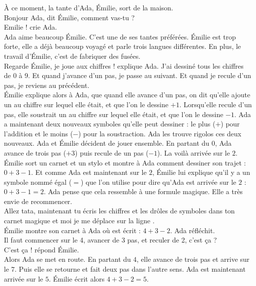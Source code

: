 À ce moment, la tante d'Ada, Émilie, sort de la maison. \\
\guillemotleft Bonjour Ada, dit Émilie, comment vas-tu ?\\
\mdash Emilie !  crie Ada. \guillemotright \\
Ada aime beaucoup Émilie. C’est une de ses tantes préférées. Émilie est trop forte, elle a déjà beaucoup voyagé et parle trois langues différentes. En plus, le travail d’Émilie, c’est de fabriquer des fusées.\\
\guillemotleft Regarde Émilie, je joue aux chiffres ! explique Ada. J’ai dessiné tous les chiffres de 0 à 9. Et quand j’avance d’un pas, je passe au suivant. Et quand je recule d’un pas, je reviens au précédent. \guillemotright \\
Émilie explique alors à Ada, que quand elle avance d’un pas, on dit qu’elle ajoute un au chiffre sur lequel elle était, et que l’on le dessine $+1$. Lorsqu’elle recule d’un pas, elle soustrait un au chiffre sur lequel elle était, et que l’on le dessine $-1$. Ada a maintenant deux nouveaux symboles qu’elle peut dessiner : le plus ($+$) pour l’addition et le moins ($-$) pour la soustraction. Ada les trouve rigolos ces deux nouveaux. 
Ada et Émilie décident de jouer ensemble. En partant du $0$, Ada avance de trois pas ($+3$) puis recule de un pas ($-1$). La voilà arrivée sur le $2$. Émilie sort un carnet et un stylo et montre à Ada comment dessiner son trajet : $0 + 3 - 1 $. Et comme Ada est maintenant sur le $2$, Émilie lui explique qu’il y a un symbole nommé égal ($=$) que l’on utilise pour dire qu’Ada est arrivée sur le $2$ : $0 + 3 - 1 = 2$. Ada pense que cela ressemble à une formule magique. Elle a très envie de recommencer. \\
\guillemotleft Allez tata, maintenant tu écris les chiffres et les drôles de symboles dans ton carnet magique et moi je me déplace sur la ligne \guillemotright. \\
Émilie montre son carnet à Ada où est écrit : $4 + 3 - 2$. Ada réfléchit. \\
\guillemotleft Il faut commencer sur le 4, avancer de 3 pas, et reculer de 2, c’est ça ? \\
\mdash C’est ça ! répond Émilie. \guillemotright \\
Alors Ada se met en route. En partant du $4$, elle avance de trois pas et arrive sur le $7$. Puis elle se retourne et fait deux pas dans l’autre sens. Ada est maintenant arrivée sur le $5$. Émilie écrit alors $4 + 3 - 2 = 5 $.\\
